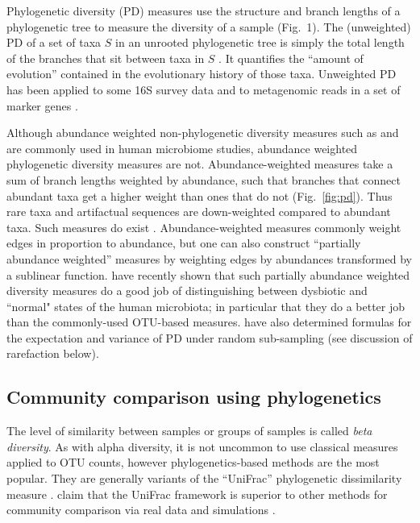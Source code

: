 \documentclass{amsart}
\begin{document}
Phylogenetic diversity (PD) measures use the structure and branch lengths of a phylogenetic tree to measure the diversity of a sample (Fig.~1).
The (unweighted) PD of a set of taxa $S$ in an unrooted phylogenetic tree is simply the total length of the branches that sit between taxa in $S$ \citep{faith1992conservation}.
It quantifies the ``amount of evolution'' contained in the evolutionary history of those taxa.
Unweighted PD has been applied to some 16S survey data \citep{lozupone2007global,costello2009bacterial} and to metagenomic reads in a set of marker genes \citep{kembel2011phylogenetic}.

Although abundance weighted non-phylogenetic diversity measures such as \citet{simpson1949measurement} and \citet{shannon1948mathematical} are commonly used in human microbiome studies, abundance weighted phylogenetic diversity measures are not.
Abundance-weighted measures take a sum of branch lengths weighted by abundance, such that branches that connect abundant taxa get a higher weight than ones that do not (Fig.~\ref{fig:pd}).
Thus rare taxa and artifactual sequences are down-weighted compared to abundant taxa.
Such measures do exist \citep{rao1982diversity,barker2002phylogenetic,allen2009new,chao2010phylogenetic,vellend2011measuring}.
Abundance-weighted measures commonly weight edges in proportion to abundance, but one can also construct ``partially abundance weighted'' measures by weighting edges by abundances transformed by a sublinear function.
\citet{mccoy2013abundance} have recently shown that such partially abundance weighted diversity measures do a good job of distinguishing between dysbiotic and ``normal" states of the human microbiota; in particular that they do a better job than the commonly-used OTU-based measures.
\citet{nipperess2013mean} have also determined formulas for the expectation and variance of PD under random sub-sampling (see discussion of rarefaction below).


\subsection{Community comparison using phylogenetics}

The level of similarity between samples or groups of samples is called \emph{beta diversity}.
As with alpha diversity, it is not uncommon to use classical measures \citep[e.g.][]{jaccard1908nouvelles} applied to OTU counts, however phylogenetics-based methods are the most popular.
They are generally variants of the ``UniFrac'' phylogenetic dissimilarity measure \citep[as described and named by][]{LozuponeKnightUniFrac05}.
\citet{kuczynski2010microbial} claim that the UniFrac framework is superior to other methods for community comparison via real data and simulations \citep[for a contrary viewpoint using simulations see][]{schloss2008evaluating}.
\end{document}
